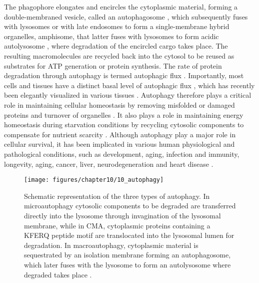 The phagophore elongates and encircles the cytoplasmic material, forming a double-membraned vesicle, called an autophagosome \citep{Cai2012,Levine2008}, which subsequently fuses with lysosomes or with late endosomes to form a single-membrane hybrid organelles, amphisome, that latter fuses with lysosomes to form acidic autolysosome \citep{Cai2012,Nixon2011,sarkar2013}, where degradation of the encircled cargo takes place. The resulting macromolecules are recycled back into the cytosol to be reused as substrates for ATP generation or protein synthesis. The rate of protein degradation through autophagy is termed autophagic flux \citep{klionsky2016,loos2014}. Importantly, most cells and tissues have a distinct basal level of autophagic flux \citep{Mizushima2004a}, which has recently been elegantly visualized in various tissues \citep{Kaizuka2016}.  Autophagy therefore plays a critical role in maintaining cellular homeostasis by removing misfolded or damaged proteins and turnover of organelles \citep{Levine2008}. It also plays a role in maintaining energy homeostasis during starvation conditions by recycling cytosolic components to compensate for nutrient scarcity \citep{Levine2008,Loos2009}. Although autophagy play a major role in cellular survival, it has been implicated in various human physiological and pathological conditions, such as development, aging, infection and immunity, longevity, aging, cancer, liver, neurodegeneration and heart disease \citep{Meijer2006,Mizushima2008,Ravikumar2010b,sarkar2013}.

\begin{figure}[!htbp]
  \texttt{[image: figures/chapter10/10\_autophagy]}
  \caption[Schematic representation of the types of autophagy types]{Schematic representation of the three types of autophagy. In microautophagy cytosolic components to be degraded are transferred directly into the lysosome through invagination of the lysosomal membrane, while in CMA, cytoplasmic proteins containing a KFERQ peptide motif are translocated into the lysosomal lumen for degradation. In macroautophagy, cytoplasmic material is sequestrated by an isolation membrane forming an autophagosome, which later fuses with the lysosome to form an autolysosome where degraded takes place \citep{Nikoletopoulou2015}.}
  \label{fig:10_autophagy}
  \end{figure}

